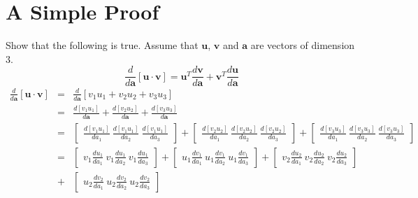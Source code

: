 \chapter{A Simple Proof}
\label{Cha:SimpleProof}
Show that the following is true. Assume that $\mathbf{u}$, $\mathbf{v}$ and $\mathbf{a}$ are
vectors of dimension 3.
\begin{equation}
    \label{ApdxB:Proof1}
    \frac{d}{d\mathbf{a}}\left[\mathbf{u}\cdot\mathbf{v}\right] =
    \mathbf{u}^T\frac{d\mathbf{v}}{d\mathbf{a}} + \mathbf{v}^T\frac{d\mathbf{u}}{d\mathbf{a}}
\end{equation}
\begin{eqnarray*}    
    \frac{d}{d\mathbf{a}}\left[\mathbf{u}\cdot\mathbf{v}\right]
    &=& \frac{d}{d\mathbf{a}}\left[v_1 u_1 + v_2 u_2 + v_3 u_3\right]\\ 
    &=& \displaystyle\frac{d[v_1 u_1]}{d\mathbf{a}} + \displaystyle\frac{d[v_2 u_2]}{d\mathbf{a}} + \displaystyle\frac{d[v_3 u_3]}{d\mathbf{a}}\\
    &=& \begin{bmatrix}
      \displaystyle\frac{d[v_1 u_1]}{da_1} \: \displaystyle\frac{d[v_1 u_1]}{da_2} \: \displaystyle\frac{d[v_1 u_1]}{da_3}
      \end{bmatrix}
      +
      \begin{bmatrix}
      \displaystyle\frac{d[v_2 u_2]}{da_1} \: \displaystyle\frac{d[v_2 u_2]}{da_2} \: \displaystyle\frac{d[v_2 u_2]}{da_3}
      \end{bmatrix}
      +
      \begin{bmatrix}
      \displaystyle\frac{d[v_3 u_3]}{da_1} \: \frac{d[v_3 u_3]}{da_2} \: \frac{d[v_3 u_3]}{da_3}
      \end{bmatrix}\\
    &=&      
      \begin{bmatrix}
      \displaystyle v_1\frac{du_1}{da_1} \: v_1\frac{du_1}{da_2} \: v_1\frac{du_1}{da_3}
      \end{bmatrix}
      +
      \begin{bmatrix}
      \displaystyle u_1\frac{dv_1}{da_1} \: u_1\frac{dv_1}{da_2} \: u_1\frac{dv_1}{da_3}
      \end{bmatrix}
      +
      \begin{bmatrix}
      \displaystyle v_2\frac{du_2}{da_1} \: v_2\frac{du_2}{da_2} \: v_2\frac{du_2}{da_3}
      \end{bmatrix}\\
    &+&
      \begin{bmatrix}
      \displaystyle u_2\frac{dv_2}{da_1} \: u_2\frac{dv_2}{da_2} \: u_2\frac{dv_2}{da_3}

\end{bmatrix}
\end{eqnarray*}
